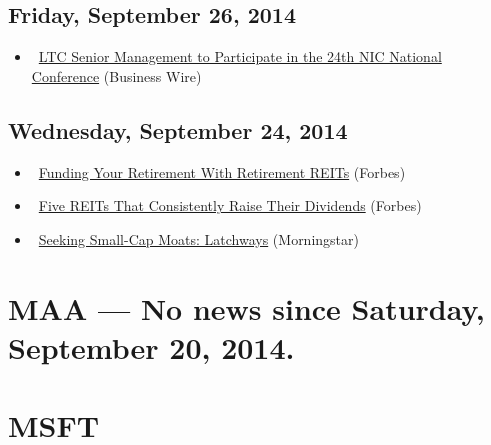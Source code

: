 \documentclass[11pt,asymmetric]{article}
\begin{document}
\subsection*{Friday, September 26, 2014}
\begin{itemize}
\item\ \href{http://finance.yahoo.com/news/ltc-senior-management-participate-24th-133000291.html}{LTC Senior Management to Participate in the 24th NIC National Conference} (Business Wire)
\end{itemize}
\subsection*{Wednesday, September 24, 2014}
\begin{itemize}
\item\ \href{http://www.forbes.com/sites/moneybuilder/2014/09/24/funding-your-retirement-with-retirement-reits/?partner=yahootix}{Funding Your Retirement With Retirement REITs} (Forbes)
\item\ \href{http://www.forbes.com/sites/moneybuilder/2014/09/24/five-reits-that-consistently-raise-their-dividends/?partner=yahootix}{Five REITs That Consistently Raise Their Dividends} (Forbes)
\item\ \href{http://news.morningstar.com/articlenet/article.aspx?id=666104&SR=Yahoo}{Seeking Small-Cap Moats: Latchways} (Morningstar)
\end{itemize}

\section*{MAA --- No news since Saturday, September 20, 2014.}


\section*{MSFT}
\end{document}
